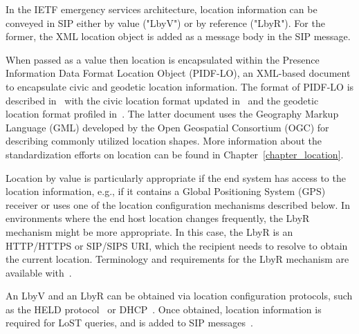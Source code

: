 \documentclass[12pt]{article}
\begin{document}
In the IETF emergency services architecture, location information can be conveyed in SIP either by value ("LbyV") or by reference ("LbyR"). For the former, the XML location object is added as a message body in the SIP message. 

When passed as a value then location is encapsulated within the Presence Information Data Format Location Object (PIDF-LO), an XML-based document to encapsulate civic and geodetic location information. The format of PIDF-LO is described in~\cite{rfc4119} with the civic location format updated in~\cite{rfc5139} and the geodetic location format profiled in~\cite{rfc5491}. The latter document uses the Geography Markup Language (GML) developed by the Open Geospatial Consortium (OGC) for describing commonly utilized location shapes. More information about the standardization efforts on location can be found in Chapter~\ref{chapter_location}.

Location by value is particularly appropriate if the end system has access to the location information, e.g., if it contains a Global Positioning System (GPS) receiver or uses one of the location configuration mechanisms described below. In environments where the end host location changes frequently, the LbyR mechanism might be more appropriate. In this case, the LbyR is an HTTP/HTTPS or SIP/SIPS URI, which the recipient needs to resolve to obtain the current location. Terminology and requirements for the LbyR mechanism are available with~\cite{rfc5808}. 

An LbyV and an LbyR can be obtained via location configuration protocols, such as the HELD protocol~\cite{rfc5985} or DHCP~\cite{rfc6225,rfc4776,draft-ietf-geopriv-dhcp-lbyr-uri-option}. Once obtained, location information is required for LoST queries, and is added to SIP messages~\cite{rfc6442}.
\end{document}
